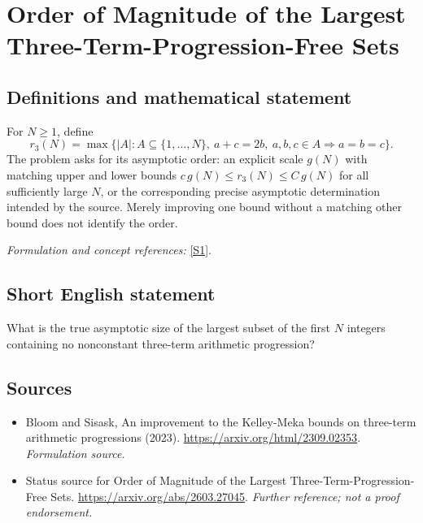 \documentclass[11pt]{article}
\begin{document}
\section*{\texorpdfstring{Order of Magnitude of the Largest Three-Term-Progression-Free Sets}{Order of Magnitude of the Largest Three-Term-Progression-Free Sets}}\label{150}
\subsection{Definitions and mathematical statement}
For $N\ge1$, define
\[
 r_3(N)=\max\{|A|:A\subseteq\{1,\ldots,N\},\
 a+c=2b,\ a,b,c\in A\Rightarrow a=b=c\}.
\]
The problem asks for its asymptotic order: an explicit scale $g(N)$ with matching upper and lower bounds $c\,g(N)\le r_3(N)\le C\,g(N)$ for all sufficiently large $N$, or the corresponding precise asymptotic determination intended by the source. Merely improving one bound without a matching other bound does not identify the order.
\par\smallskip\textit{Formulation and concept references:} \href{https://arxiv.org/html/2309.02353}{[S1]}.

\subsection{Short English statement}
What is the true asymptotic size of the largest subset of the first $N$ integers containing no nonconstant three-term arithmetic progression?
\subsection{Sources}
\begin{itemize}
\item[S1]Bloom and Sisask, An improvement to the Kelley-Meka bounds on three-term arithmetic progressions (2023).
\url{https://arxiv.org/html/2309.02353}.
\textit{Formulation source.}
\item[S2]Status source for Order of Magnitude of the Largest Three-Term-Progression-Free Sets.
\url{https://arxiv.org/abs/2603.27045}.
\textit{Further reference; not a proof endorsement.}
\end{itemize}
\end{document}
